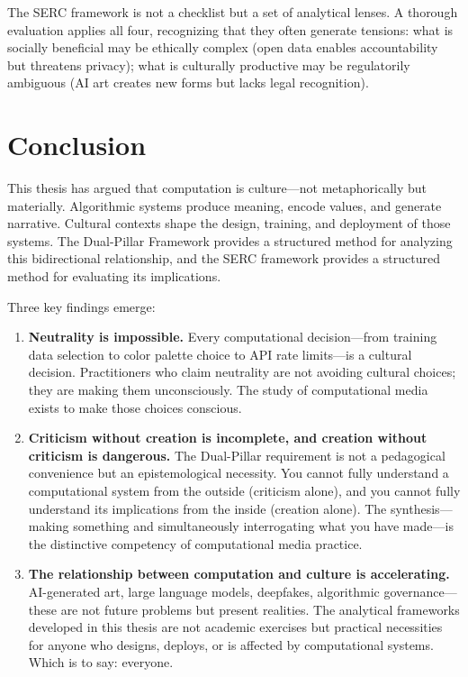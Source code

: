 \documentclass[11pt,a4paper]{article}
\begin{document}
The SERC framework is not a checklist but a set of analytical lenses. A thorough evaluation applies all four, recognizing that they often generate tensions: what is socially beneficial may be ethically complex (open data enables accountability but threatens privacy); what is culturally productive may be regulatorily ambiguous (AI art creates new forms but lacks legal recognition).

\section{Conclusion}

This thesis has argued that computation is culture---not metaphorically but materially. Algorithmic systems produce meaning, encode values, and generate narrative. Cultural contexts shape the design, training, and deployment of those systems. The Dual-Pillar Framework provides a structured method for analyzing this bidirectional relationship, and the SERC framework provides a structured method for evaluating its implications.

Three key findings emerge:

\begin{enumerate}[leftmargin=*, itemsep=4pt]
  \item \textbf{Neutrality is impossible.} Every computational decision---from training data selection to color palette choice to API rate limits---is a cultural decision. Practitioners who claim neutrality are not avoiding cultural choices; they are making them unconsciously. The study of computational media exists to make those choices conscious.

  \item \textbf{Criticism without creation is incomplete, and creation without criticism is dangerous.} The Dual-Pillar requirement is not a pedagogical convenience but an epistemological necessity. You cannot fully understand a computational system from the outside (criticism alone), and you cannot fully understand its implications from the inside (creation alone). The synthesis---making something and simultaneously interrogating what you have made---is the distinctive competency of computational media practice.

  \item \textbf{The relationship between computation and culture is accelerating.} AI-generated art, large language models, deepfakes, algorithmic governance---these are not future problems but present realities. The analytical frameworks developed in this thesis are not academic exercises but practical necessities for anyone who designs, deploys, or is affected by computational systems. Which is to say: everyone.
\end{enumerate}
\end{document}

